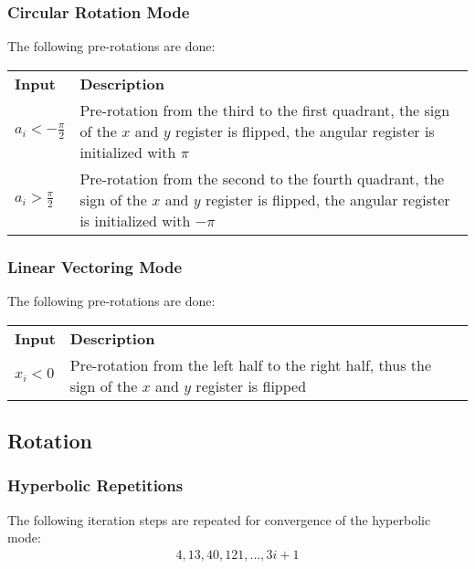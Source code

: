 \documentclass[a4paper, 12pt, notitlepage]{report}
\begin{document}
      \subsubsection{Circular Rotation Mode}
      The following pre-rotations are done:\newline\newline
         \begin{tabular}{@{}lp{380pt}@{}}
            \rowcolor{tableheadcolor}\textbf{Input} &\textbf{ Description }  \\
      
            $a_i < - \frac{\pi}{2}$    & Pre-rotation from the third to the first quadrant, 
                                         the sign of the $x$ and $y$ register is flipped, 
                                         the angular register is initialized with $\pi$   \\ \midrule
      
            $a_i >   \frac{\pi}{2}$    & Pre-rotation from the second to the fourth quadrant, 
                                         the sign of the $x$ and $y$ register is flipped, 
                                         the angular register is initialized with $-\pi$   \\
            \bottomrule
         \end{tabular}
      
      \subsubsection{Linear Vectoring Mode}
      The following pre-rotations are done:\newline\newline
         \begin{tabular}{@{}lp{380pt}@{}}
            \rowcolor{tableheadcolor}\textbf{Input} &\textbf{ Description }  \\
      
            $x_i < 0$          & Pre-rotation from the left half to the right half, thus
                                 the sign of the $x$ and $y$ register is flipped \\
            \bottomrule
         \end{tabular}


   \subsection{Rotation}

   \subsubsection{Hyperbolic Repetitions}
   The following iteration steps are repeated for convergence of the hyperbolic mode:
   \begin{eqnarray}
      4, 13, 40, 121, ..., 3i+1
   \end{eqnarray}
\end{document}
